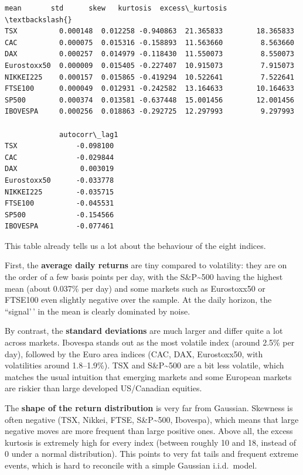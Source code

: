 \documentclass[11pt]{article}
\begin{document}
            \begin{tcolorbox}[breakable, size=fbox, boxrule=.5pt, pad at break*=1mm, opacityfill=0]
\begin{Verbatim}[commandchars=\\\{\}]
                 mean       std      skew   kurtosis  excess\_kurtosis  \textbackslash{}
TSX          0.000148  0.012258 -0.940863  21.365833        18.365833
CAC          0.000075  0.015316 -0.158893  11.563660         8.563660
DAX          0.000257  0.014979 -0.118430  11.550073         8.550073
Eurostoxx50  0.000009  0.015405 -0.227407  10.915073         7.915073
NIKKEI225    0.000157  0.015865 -0.419294  10.522641         7.522641
FTSE100      0.000049  0.012931 -0.242582  13.164633        10.164633
SP500        0.000374  0.013581 -0.637448  15.001456        12.001456
IBOVESPA     0.000256  0.018863 -0.292725  12.297993         9.297993

             autocorr\_lag1
TSX              -0.098100
CAC              -0.029844
DAX               0.003019
Eurostoxx50      -0.033778
NIKKEI225        -0.035715
FTSE100          -0.045531
SP500            -0.154566
IBOVESPA         -0.077461
\end{Verbatim}
\end{tcolorbox}
        
    This table already tells us a lot about the behaviour of the eight
indices.

First, the \textbf{average daily returns} are tiny compared to
volatility: they are on the order of a few basis points per day, with
the S\&P\textasciitilde500 having the highest mean (about 0.037\% per
day) and some markets such as Eurostoxx50 or FTSE100 even slightly
negative over the sample. At the daily horizon, the ``signal'\,' in the
mean is clearly dominated by noise.

By contrast, the \textbf{standard deviations} are much larger and differ
quite a lot across markets. Ibovespa stands out as the most volatile
index (around 2.5\% per day), followed by the Euro area indices (CAC,
DAX, Eurostoxx50, with volatilities around 1.8--1.9\%). TSX and
S\&P\textasciitilde500 are a bit less volatile, which matches the usual
intuition that emerging markets and some European markets are riskier
than large developed US/Canadian equities.

The \textbf{shape of the return distribution} is very far from Gaussian.
Skewness is often negative (TSX, Nikkei, FTSE, S\&P\textasciitilde500,
Ibovespa), which means that large negative moves are more frequent than
large positive ones. Above all, the excess kurtosis is extremely high
for every index (between roughly 10 and 18, instead of 0 under a normal
distribution). This points to very fat tails and frequent extreme
events, which is hard to reconcile with a simple Gaussian i.i.d.~model.
\end{document}

